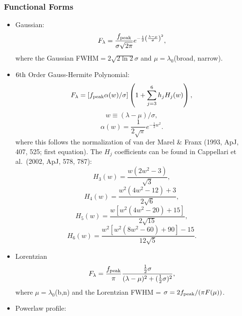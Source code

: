 \documentclass[12pt,letterpaper]{article}
\begin{document}
\subsubsection*{Functional Forms}
  \begin{itemize}
    \item Gaussian:
      \begin{equation} F_{\lambda} = \frac{f_{\rm peak}}{\sigma \sqrt{2\pi}}e^{-\frac{1}{2}\left(\frac{\lambda - \mu}{\sigma}\right)^2},
        \end{equation}
        where the Gaussian FWHM$=2\sqrt{2\ln 2}\sigma$ and $\mu=\lambda_0$(broad, narrow).\\

     \item $6{\rm th}$ Order Gauss-Hermite Polynomial:
       \begin{equation} F_{\lambda} = [f_{\rm peak} \alpha(w)/\sigma]\left(1 + \sum_{j=3}^{6}h_jH_j(w) \right), 
       \end{equation} 
       \begin{equation} w\equiv (\lambda - \mu)/\sigma,
       \end{equation}
       \begin{equation} \alpha(w) = \frac{1}{2\sqrt{\pi}} e^{-\frac{1}{2}w^2}. \end{equation}
       where this follows the normalization of van der Marel \& Franx (1993, ApJ, 407, 525; first equation).  The $H_j$ coefficients can be found in Cappellari et al.\ (2002, ApJ, 578, 787):
       \begin{equation} H_3(w) = \frac{w(2w^2-3)}{\sqrt{3}}, \end{equation}
       \begin{equation} H_4(w) = \frac{w^2(4w^2-12)+3}{2\sqrt{6}}, \end{equation}
       \begin{equation} H_5(w) = \frac{w[w^2(4w^2-20)+15]}{2\sqrt{15}}, \end{equation}
       \begin{equation} H_6(w) = \frac{w^2[w^2(8w^2-60)+90]-15}{12\sqrt{5}}. \end{equation}

     \item Lorentzian
       \begin{equation} F_{\lambda} = \frac{f_{\rm peak}}{\pi} \frac{\frac{1}{2}\sigma}{(\lambda - \mu)^2+(\frac{1}{2}\sigma)^2},
       \end{equation}
       where $\mu=\lambda_0$(b,n) and the Lorentzian FWHM = $\sigma = 2f_{\rm peak}/(\pi F(\mu))$.

     \item Powerlaw profile:
  \end{itemize}
\end{document}

